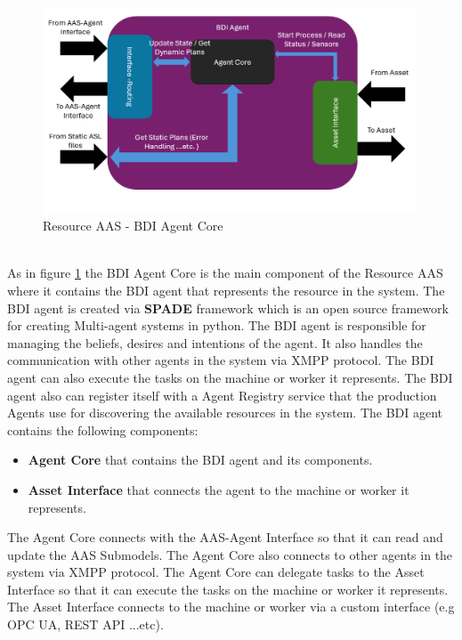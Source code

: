 \newpage
{}
\begin{figure}[h]
    \centering
    \includegraphics[width=0.99\textwidth]{Images/Resource_Agent_BDI_Overview.png}
    \caption{Resource AAS - BDI Agent Core}
    \label{fig:resource_aas_bdi_agent_core}
\end{figure}
\\
As in figure \ref{fig:resource_aas_bdi_agent_core} the BDI Agent Core is the main component of the Resource AAS where it contains the BDI agent that represents the resource in the system.
The BDI agent is created via \textbf{SPADE} framework which is an open source framework for creating Multi-agent systems in python.
The BDI agent is responsible for managing the beliefs, desires and intentions of the agent.
It also handles the communication with other agents in the system via XMPP protocol.
The BDI agent can also execute the tasks on the machine or worker it represents.
The BDI agent also can register itself with a Agent Registry service that the production Agents
use for discovering the available resources in the system.
The BDI agent contains the following components:
\begin{itemize}
    \item \textbf{Agent Core} that contains the BDI agent and its components.
    \item \textbf{Asset Interface} that connects the agent to the machine or worker it represents.
\end{itemize}
The Agent Core connects with the AAS-Agent Interface so that it can read and update the AAS Submodels.
The Agent Core also connects to other agents in the system via XMPP protocol.
The Agent Core can delegate tasks to the Asset Interface so that it can execute the tasks on the machine or worker it represents.
The Asset Interface connects to the machine or worker via a custom interface (e.g OPC UA, REST API ...etc).

